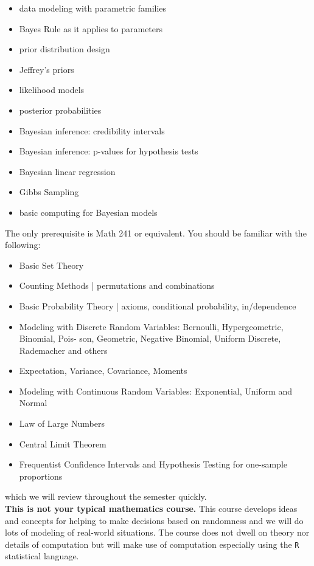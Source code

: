 \documentclass[12pt]{article}
\begin{document}
\begin{itemize}
\itemsep -0.0em 
\item data modeling with parametric families
\item Bayes Rule as it applies to parameters
\item prior distribution design 
\item Jeffrey's priors 
\item likelihood models 
\item posterior probabilities 
\item Bayesian inference: credibility intervals 
\item Bayesian inference: p-values for hypothesis tests
\item Bayesian linear regression
\item Gibbs Sampling 
\item basic computing for Bayesian models
\end{itemize}

\noindent The only prerequisite is Math 241 or equivalent. You should be familiar with the following:

\begin{itemize}
\itemsep -0.0em 
\item Basic Set Theory
\item Counting Methods | permutations and combinations
\item  Basic Probability Theory | axioms, conditional probability, in/dependence
\item Modeling with Discrete Random Variables: Bernoulli, Hypergeometric, Binomial, Pois-
son, Geometric, Negative Binomial, Uniform Discrete, Rademacher and others
\item Expectation, Variance, Covariance, Moments
\item Modeling with Continuous Random Variables: Exponential, Uniform and Normal
\item Law of Large Numbers
\item Central Limit Theorem
\item Frequentist Confidence Intervals and Hypothesis Testing for one-sample proportions
\end{itemize}

\noindent which we will review throughout the semester quickly. \\

\textbf{This is not your typical mathematics course.} This course develops ideas and concepts for helping to make decisions based on randomness and we will do lots of modeling of real-world situations. The course does not dwell on theory nor details of computation but will make use of computation especially using the \texttt{R} statistical language.
\end{document}
